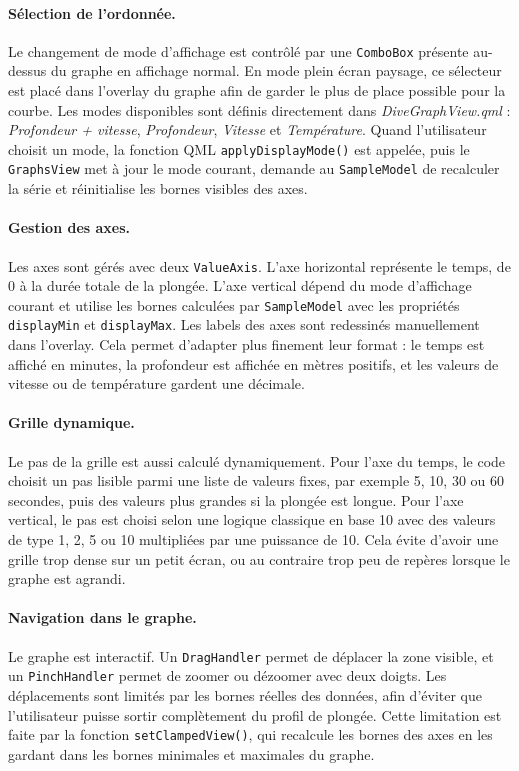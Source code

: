 \documentclass{article}
\begin{document}
\paragraph{Sélection de l'ordonnée.}
Le changement de mode d'affichage est contrôlé par une \texttt{ComboBox}
présente au-dessus du graphe en affichage normal. En mode plein écran paysage,
ce sélecteur est placé dans l'overlay du graphe afin de garder le plus de place
possible pour la courbe. Les modes disponibles sont définis directement dans
\textit{DiveGraphView.qml} : \textit{Profondeur + vitesse},
\textit{Profondeur}, \textit{Vitesse} et \textit{Température}. Quand
l'utilisateur choisit un mode, la fonction QML \texttt{applyDisplayMode()} est
appelée, puis le \texttt{GraphsView} met à jour le mode courant, demande au
\texttt{SampleModel} de recalculer la série et réinitialise les bornes visibles
des axes.

\paragraph{Gestion des axes.}
Les axes sont gérés avec deux \texttt{ValueAxis}. L'axe horizontal représente le
temps, de 0 à la durée totale de la plongée. L'axe vertical dépend du mode
d'affichage courant et utilise les bornes calculées par \texttt{SampleModel}
avec les propriétés \texttt{displayMin} et \texttt{displayMax}. Les labels des
axes sont redessinés manuellement dans l'overlay. Cela permet d'adapter plus
finement leur format : le temps est affiché en minutes, la profondeur est
affichée en mètres positifs, et les valeurs de vitesse ou de température gardent
une décimale.

\paragraph{Grille dynamique.}
Le pas de la grille est aussi calculé dynamiquement. Pour l'axe du temps, le
code choisit un pas lisible parmi une liste de valeurs fixes, par exemple 5, 10,
30 ou 60 secondes, puis des valeurs plus grandes si la plongée est longue. Pour
l'axe vertical, le pas est choisi selon une logique classique en base 10 avec
des valeurs de type 1, 2, 5 ou 10 multipliées par une puissance de 10. Cela
évite d'avoir une grille trop dense sur un petit écran, ou au contraire trop peu
de repères lorsque le graphe est agrandi.

\paragraph{Navigation dans le graphe.}
Le graphe est interactif. Un \texttt{DragHandler} permet de déplacer la zone
visible, et un \texttt{PinchHandler} permet de zoomer ou dézoomer avec deux
doigts. Les déplacements sont limités par les bornes réelles des données, afin
d'éviter que l'utilisateur puisse sortir complètement du profil de plongée. Cette
limitation est faite par la fonction \texttt{setClampedView()}, qui recalcule
les bornes des axes en les gardant dans les bornes minimales et maximales du
graphe.
\end{document}
